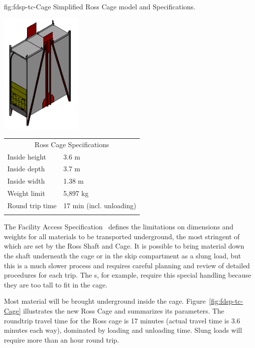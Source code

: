 \begin{dunefigure}
{fig:fdsp-tc-Cage}
{Simplified Ross Cage model and Specifications.}
\parbox{2.1in}{\includegraphics[width=0.3\textwidth]{graphics/Cage-view.pdf}}
\qquad\hspace{10pt}
\begin{minipage}{0.5\textwidth}%
\begin{tabular}{p{3.4cm}p{3.4cm}}        
\multicolumn{2}{c}{Ross Cage Specifications}\\ \toprowrule
Inside height & 3.6 m\\ \colhline
Inside depth  & 3.7 m \\ \colhline
Inside width  & 1.38 m \\ \colhline
Weight limit  &  5,897 kg \\ \colhline
Round trip \newline time & 17 min \newline (incl. unloading) \\ \colhline
\end{tabular}
\end{minipage}
\end{dunefigure}

The  Facility Access Specification~\cite{bib:docdb328} defines the limitations on dimensions and weights for all materials to be transported underground, the most stringent of which are set by the Ross Shaft and Cage. 
It is possible to bring material down the shaft underneath the cage or in the skip compartment  as a slung load, but this is a much slower process and requires careful planning %
and review of detailed procedures for each trip. 
The  s, for example, require this special handling because they are too tall to fit in the cage. 

Most material will be brought underground inside the cage. Figure~\ref{fig:fdsp-tc-Cage} illustrates the new Ross Cage and summarizes its parameters.  
The roundtrip travel time for the Ross cage is 17 minutes (actual travel time is \num{3.6} minutes each way), dominated by loading and unloading time.  
Slung loads will require more than an hour round trip.



